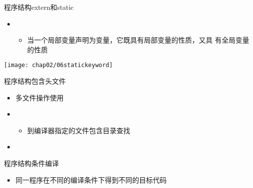 \begin{frame}[fragile]{程序结构}{extern和static}
  \begin{itemize}  
  \item {}    
    \begin{itemize}
      \tiny
    \item 当一个局部变量声明为变量，它既具有局部变量的性质，又具
      有全局变量的性质
    \end{itemize}
  \end{itemize}
  \begin{center}
    \begin{minipage}{0.53\linewidth}
    \end{minipage}\qquad
    \begin{minipage}{0.35\linewidth}
      \texttt{[image: chap02/06statickeyword]}
    \end{minipage}
  \end{center}
\end{frame}

\begin{frame}[fragile]{程序结构}{包含头文件}
  \stretchon
  \begin{itemize}  
  \item 多文件操作使用
  \item {}
    \begin{itemize}
    \item 到编译器指定的文件包含目录查找
    \end{itemize}
  \item {}
  \end{itemize}
  \stretchoff
\end{frame}

\begin{frame}[fragile]{程序结构}{条件编译}
  \begin{itemize}
  \item 同一程序在不同的编译条件下得到不同的目标代码
  \end{itemize}
  \begin{center}
    \begin{minipage}{0.6\linewidth}
    \end{minipage}
  \end{center}
\end{frame}

